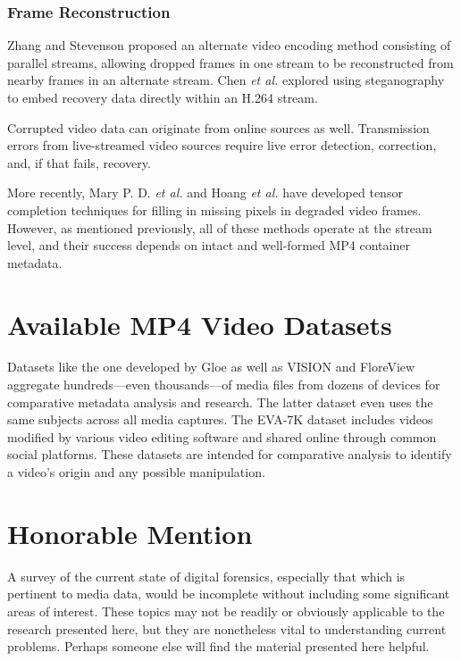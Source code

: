 \subsubsection{Frame Reconstruction}

Zhang and Stevenson \cite{zhang2004} proposed an alternate video encoding method consisting of parallel streams, allowing dropped frames in one stream to be reconstructed from nearby frames in an alternate stream. Chen \emph{et al.} \cite{chen2011} explored using steganography to embed recovery data directly within an H.264 stream.

Corrupted video data can originate from online sources as well. Transmission errors from live-streamed video sources require live error detection, correction, and, if that fails, recovery. 

More recently, Mary P. D. \emph{et al.} \cite{mary2020} and Hoang \emph{et al.} \cite{hoang2020} have developed tensor completion techniques for filling in missing pixels in degraded video frames. However, as mentioned previously, all of these methods operate at the stream level, and their success depends on intact and well-formed MP4 container metadata.

\section{Available MP4 Video Datasets}

Datasets like the one developed by Gloe \cite{gloe2014} as well as VISION \cite{shullani2017} and FloreView \cite{baracchi2023} aggregate hundreds---even thousands---of media files from dozens of devices for comparative metadata analysis and research. The latter dataset even uses the same subjects across all media captures. The EVA-7K \cite{yang2020} dataset includes videos modified by various video editing software and shared online through common social platforms. These datasets are intended for comparative analysis to identify a video's origin and any possible manipulation.

\section{Honorable Mention}

A survey of the current state of digital forensics, especially that which is pertinent to media data, would be incomplete without including some significant areas of interest. These topics may not be readily or obviously applicable to the research presented here, but they are nonetheless vital to understanding current problems. Perhaps someone else will find the material presented here helpful.

